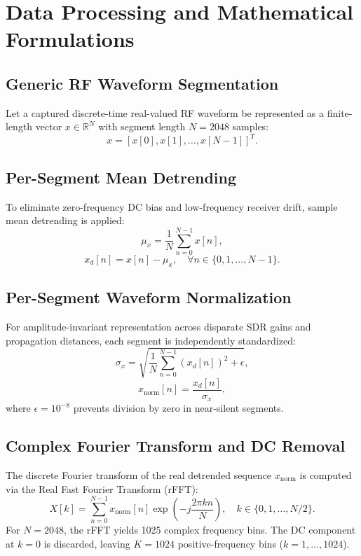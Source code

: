 \documentclass[journal,10pt,twocolumn]{IEEEtran}
\begin{document}
\section{Data Processing and Mathematical Formulations}

\subsection{Generic RF Waveform Segmentation}
Let a captured discrete-time real-valued RF waveform be represented as a finite-length vector $x \in \mathbb{R}^N$ with segment length $N = 2048$ samples:
\begin{equation}
x = [x[0], x[1], \dots, x[N-1]]^T.
\label{eq:waveform}
\end{equation}

\subsection{Per-Segment Mean Detrending}
To eliminate zero-frequency DC bias and low-frequency receiver drift, sample mean detrending is applied:
\begin{equation}
\mu_x = \frac{1}{N} \sum_{n=0}^{N-1} x[n],
\label{eq:mean_detrend}
\end{equation}
\begin{equation}
x_d[n] = x[n] - \mu_x, \quad \forall n \in \{0, 1, \dots, N-1\}.
\label{eq:detrended_sig}
\end{equation}

\subsection{Per-Segment Waveform Normalization}
For amplitude-invariant representation across disparate SDR gains and propagation distances, each segment is independently standardized:
\begin{equation}
\sigma_x = \sqrt{\frac{1}{N} \sum_{n=0}^{N-1} (x_d[n])^2 + \epsilon},
\label{eq:std_seg}
\end{equation}
\begin{equation}
x_{\text{norm}}[n] = \frac{x_d[n]}{\sigma_x},
\label{eq:norm_seg}
\end{equation}
where $\epsilon = 10^{-8}$ prevents division by zero in near-silent segments.

\subsection{Complex Fourier Transform and DC Removal}
The discrete Fourier transform of the real detrended sequence $x_{\text{norm}}$ is computed via the Real Fast Fourier Transform (rFFT):
\begin{equation}
X[k] = \sum_{n=0}^{N-1} x_{\text{norm}}[n] \exp\left(-j \frac{2\pi k n}{N}\right), \quad k \in \{0, 1, \dots, N/2\}.
\label{eq:rfft}
\end{equation}
For $N=2048$, the rFFT yields 1025 complex frequency bins. The DC component at $k=0$ is discarded, leaving $K = 1024$ positive-frequency bins ($k = 1, \dots, 1024$).
\end{document}
